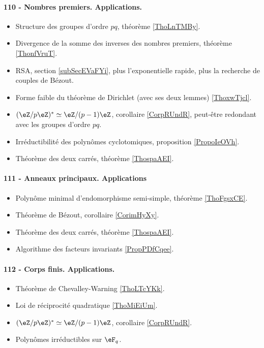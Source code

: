 \paragraph{110 - Nombres premiers. Applications.}
\begin{itemize}
    \item Structure des groupes d'ordre \( pq\), théorème \ref{ThoLnTMBy}.
    \item Divergence de la somme des inverses des nombres premiers, théorème \ref{ThonfVruT}.
    \item RSA, section \ref{subSecEVaFYi}, plus l'exponentielle rapide, plus la recherche de couples de Bézout.
    \item Forme faible du théorème de Dirichlet (avec ses deux lemmes) \ref{ThoxwTjcl}.
    \item \( (\eZ/p\eZ)^*\simeq \eZ/(p-1)\eZ\), corollaire \ref{CorpRUndR}, peut-être redondant avec les groupes d'ordre \( pq\).
    \item Irréductibilité des polynômes cyclotomiques, proposition \ref{PropoIeOVh}.
    \item Théorème des deux carrés, théorème \ref{ThospaAEI}.
\end{itemize}

\paragraph{111 - Anneaux principaux. Applications}
\begin{itemize}
    \item Polynôme minimal d'endomorphisme semi-simple, théorème \ref{ThoFgsxCE}.
    \item Théorème de Bézout, corollaire \ref{CorimHyXy}.
    \item Théorème des deux carrés, théorème \ref{ThospaAEI}.
    \item Algorithme des facteurs invariants \ref{PropPDfCqee}.
\end{itemize}

\paragraph{112 - Corps finis. Applications.}
\begin{itemize}
    \item Théorème de Chevalley-Warning \ref{ThoLTcYKk}.
    \item Loi de réciprocité quadratique \ref{ThoMiEiUm}.
    \item \( (\eZ/p\eZ)^*\simeq \eZ/(p-1)\eZ\), corollaire \ref{CorpRUndR}.
    \item Polynômes irréductibles sur \( \eF_q\).
\end{itemize}

